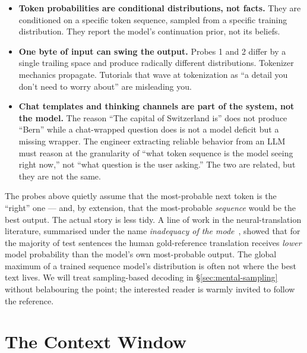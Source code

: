 \begin{itemize}[leftmargin=1.5em,itemsep=0.3em]

\item \textbf{Token probabilities are conditional distributions,
  not facts.} They are conditioned on a specific token sequence,
  sampled from a specific training distribution. They report the
  model's continuation prior, not its beliefs.

\item \textbf{One byte of input can swing the output.} Probes 1
  and 2 differ by a single trailing space and produce radically
  different distributions. Tokenizer mechanics propagate.
  Tutorials that wave at tokenization as ``a detail you don't
  need to worry about'' are misleading you.

\item \textbf{Chat templates and thinking channels are part of
  the system, not the model.} The reason ``The capital of
  Switzerland is'' does not produce ``Bern'' while a chat-wrapped
  question does is not a model deficit but a missing wrapper.
  The engineer extracting reliable behavior from an LLM must
  reason at the granularity of ``what token sequence is the model
  seeing right now,'' not ``what question is the user asking.''
  The two are related, but they are not the same.

\end{itemize}

\begin{asidebox}[title={Aside --- Choosing the ``best'' sequence}]
\small
The probes above quietly assume that the most-probable next token
is the ``right'' one --- and, by extension, that the most-probable
\emph{sequence} would be the best output. The actual story is less
tidy. A line of work in the neural-translation literature, summarised
under the name \emph{inadequacy of the mode}~\citep{eikema2020inadequacy},
showed that for the majority of test sentences the human
gold-reference translation receives \emph{lower} model probability
than the model's own most-probable output. The global maximum of a
trained sequence model's distribution is often not where the best
text lives. We will treat sampling-based decoding in
\S\ref{sec:mental-sampling} without belabouring the point; the
interested reader is warmly invited to follow the reference.
\end{asidebox}

\section{The Context Window}
\label{sec:mental-context}

